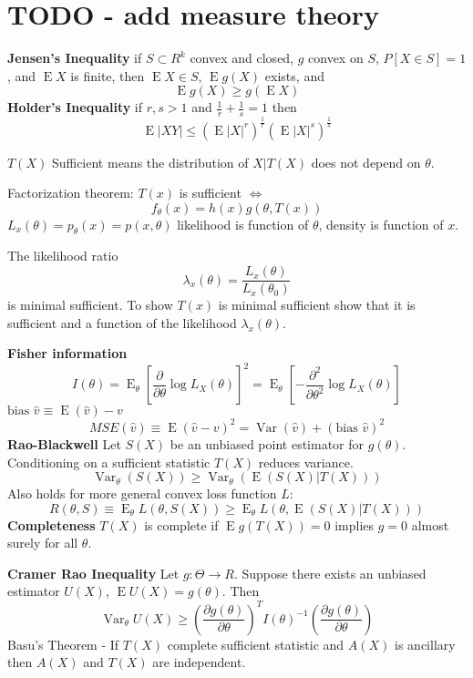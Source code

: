 \documentclass[10pt, twocolumn]{article}
\newcommand{\Expect}{\operatorname{E}}
\newcommand{\Var}{\operatorname{Var}}
\begin{document}
\section*{TODO - add measure theory}

\textbf{Jensen's Inequality} if $S \subset R^k$ convex and closed, $g$ convex on $S$, $P[X
\in S] = 1$, and $\Expect X$ is finite, then $\Expect X \in S$, $\Expect
g(X)$ exists, and
\[
    \Expect g(X) \geq g(\Expect X)
\]
\textbf{Holder's Inequality} if $r, s > 1$ and $\frac{1}{r} + \frac{1}{s} =
1$ then
\[
    \Expect |XY| \leq (\Expect |X|^r)^{\frac{1}{r}}(\Expect |X|^s)^{\frac{1}{s}}
\]

$T(X)$ Sufficient means the distribution of $X | T(X)$ does not depend on
$\theta$.

Factorization theorem: $T(x)$ is sufficient $\iff$
\[
    f_{\theta}(x) = h(x) g(\theta, T(x))
\]
$L_x (\theta) = p_\theta (x) = p(x, \theta)$ likelihood is function of
$\theta$, density is function of $x$.

The likelihood ratio
\[
    \lambda_x (\theta) = \frac{L_x (\theta)}{L_x (\theta_0)}
\]
is minimal sufficient. To show $T(x)$ is minimal sufficient show that it is
sufficient and a function of the likelihood $\lambda_x (\theta)$.

\textbf{Fisher information}
\[
    I(\theta) = \Expect_\theta \left[ \frac{\partial}{\partial \theta} 
    \log L_X (\theta) \right]^2
    = \Expect_\theta \left[ - \frac{\partial^2}{\partial \theta^2}
    \log L_X (\theta) \right]
\]
$\text{bias } \hat{v} \equiv \Expect (\hat{v}) - v$
\[
    MSE(\hat{v}) \equiv \Expect (\hat{v} - v)^2 
    = \Var (\hat{v}) + (\text{bias } \hat{v})^2
\]
\textbf{Rao-Blackwell} Let $S(X)$ be an unbiased point estimator for
$g(\theta)$. Conditioning on a sufficient statistic $T(X)$ reduces
variance.
\[
    \Var_{\theta} (S(X)) \geq \Var_{\theta} (\Expect (S(X) | T(X)))
\]
Also holds for more general convex loss function $L$:
\[
    R(\theta, S) \equiv \Expect_{\theta} L(\theta, S(X)) \geq
    \Expect_{\theta} L(\theta, \Expect( S(X) | T(X)))
\]
\textbf{Completeness} $T(X)$ is complete if $\Expect g(T(X)) = 0$ 
implies $g = 0$ almost surely for all $\theta$.

\textbf{Cramer Rao Inequality} Let $g: \Theta \rightarrow R$. Suppose there
exists an unbiased estimator $U(X)$, $\Expect U(X) = g(\theta)$. Then
\[
    \Var_\theta U(X) \geq 
    \left( \frac{\partial g(\theta)}{\partial \theta} \right)^T
    I(\theta)^{-1}
    \left( \frac{\partial g(\theta)}{\partial \theta} \right)
\]
Basu's Theorem - If $T(X)$ complete sufficient statistic and $A(X)$ is 
ancillary then $A(X)$ and $T(X)$ are independent.
\end{document}
